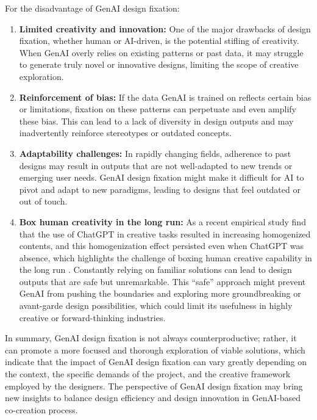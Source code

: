For the disadvantage of GenAI design fixation:
\begin{enumerate}
    \item \textbf{Limited creativity and innovation: }One of the major drawbacks of design fixation, whether human or AI-driven, is the potential stifling of creativity. When GenAI overly relies on existing patterns or past data, it may struggle to generate truly novel or innovative designs, limiting the scope of creative exploration.
    \item \textbf{Reinforcement of bias: }If the data GenAI is trained on reflects certain bias or limitations, fixation on these patterns can perpetuate and even amplify these bias. This can lead to a lack of diversity in design outputs and may inadvertently reinforce stereotypes or outdated concepts. 
    \item \textbf{Adaptability challenges: }In rapidly changing fields, adherence to past designs may result in outputs that are not well-adapted to new trends or emerging user needs. GenAI design fixation might make it difficult for AI to pivot and adapt to new paradigms, leading to designs that feel outdated or out of touch.
    \item \textbf{Box human creativity in the long run: }As a recent empirical study find that the use of ChatGPT in creative tasks resulted in increasing homogenized contents, and this homogenization effect persisted even when ChatGPT was absence, which highlights the challenge of boxing human creative capability in the long run \cite{liu2024chatgpt}. Constantly relying on familiar solutions can lead to design outputs that are safe but unremarkable. This “safe” approach might prevent GenAI from pushing the boundaries and exploring more groundbreaking or avant-garde design possibilities, which could limit its usefulness in highly creative or forward-thinking industries.
\end{enumerate}

In summary, GenAI design fixation is not always counterproductive; rather, it can promote a more focused and thorough exploration of viable solutions, which indicate that the impact of GenAI design fixation can vary greatly depending on the context, the specific demands of the project, and the creative framework employed by the designers. The perspective of GenAI design fixation may bring new insights to balance design efficiency and design innovation in GenAI-based co-creation process.


